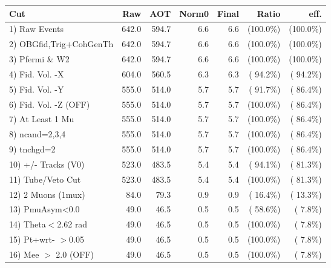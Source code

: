  \begin{table}[h!]\centering
 \begin{tabular}{||l||r|r|r|r|r|r||}
 \hline
 \hline
 Cut & Raw & AOT & Norm0 & Final & Ratio & eff.       \\
 \hline
  1) Raw Events           &        642.0 &        594.7 &          6.6 &          6.6 & (100.0\%) & (100.0\%) \\
  2) OBGfid,Trig+CohGenTh &        642.0 &        594.7 &          6.6 &          6.6 & (100.0\%) & (100.0\%) \\
  3) Pfermi \& W2         &        642.0 &        594.7 &          6.6 &          6.6 & (100.0\%) & (100.0\%) \\
  4) Fid. Vol. -X         &        604.0 &        560.5 &          6.3 &          6.3 & ( 94.2\%) & ( 94.2\%) \\
  5) Fid. Vol. -Y         &        555.0 &        514.0 &          5.7 &          5.7 & ( 91.7\%) & ( 86.4\%) \\
  6) Fid. Vol. -Z (OFF)   &        555.0 &        514.0 &          5.7 &          5.7 & (100.0\%) & ( 86.4\%) \\
  7) At Least 1 Mu        &        555.0 &        514.0 &          5.7 &          5.7 & (100.0\%) & ( 86.4\%) \\
  8) ncand=2,3,4          &        555.0 &        514.0 &          5.7 &          5.7 & (100.0\%) & ( 86.4\%) \\
  9) tnchgd=2             &        555.0 &        514.0 &          5.7 &          5.7 & (100.0\%) & ( 86.4\%) \\
 10) +/- Tracks (V0)      &        523.0 &        483.5 &          5.4 &          5.4 & ( 94.1\%) & ( 81.3\%) \\
 11) Tube/Veto Cut        &        523.0 &        483.5 &          5.4 &          5.4 & (100.0\%) & ( 81.3\%) \\
 12) 2 Muons (1mux)       &         84.0 &         79.3 &          0.9 &          0.9 & ( 16.4\%) & ( 13.3\%) \\
 13) PmuAsym<0.0          &         49.0 &         46.5 &          0.5 &          0.5 & ( 58.6\%) & (  7.8\%) \\
 14) Theta$<$2.62 rad     &         49.0 &         46.5 &          0.5 &          0.5 & (100.0\%) & (  7.8\%) \\
 15) Pt+wrt- $>$0.05      &         49.0 &         46.5 &          0.5 &          0.5 & (100.0\%) & (  7.8\%) \\
 16) Mee $>$ 2.0  (OFF)   &         49.0 &         46.5 &          0.5 &          0.5 & (100.0\%) & (  7.8\%) \\

\end{tabular}
\end{table}
